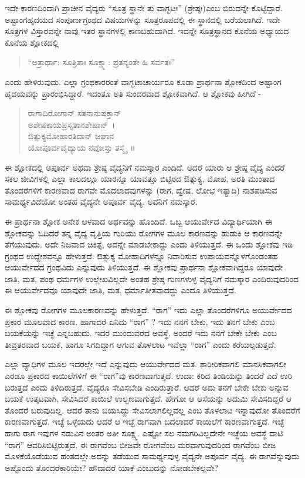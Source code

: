 {ಇದೇ ಕಾರಣದಿಂದಾಗಿ ಪ್ರಾಚೀನ ವೈದ್ಯರು “ಸೂತ್ರ ಸ್ಥಾನೇ ತು ವಾಗ್ಭಟಃ” \enginline{-} (ಶ್ರೇಷ್ಠಃ)ಎಂಬ ಬಿರುದನ್ನೇ ಕೊಟ್ಟಿದ್ದಾರೆ. ಅಷ್ಟಾಂಗಹೃದಯದ ಸಂಪೂರ್ಣಗ್ರಂಥದ ವಿಷಯಗಳನ್ನು ಸೂತ್ರರೂಪದಲ್ಲಿ ಈ ಸ್ಥಾನದಲ್ಲಿ ಬರೆಯಲಾಗಿದೆ. ಇದೇ ಸೂತ್ರಗಳ ವಿಸ್ತಾರವನ್ನೇ ನಾವು ಇತರ ಸ್ಥಾನಗಳಲ್ಲಿ ಕಾಣಬಹುದಾಗಿದೆ. ಇದನ್ನೇ ಸೂತ್ರಸ್ಥಾನದ ಕೊನೆಯ ಅಧ್ಯಾಯದ ಕೊನೆಯ ಶ್ಲೋಕದಲ್ಲಿ 
\begin{verse}
“ಅತ್ರಾರ್ಥಾ: ಸೂತ್ರಿತಾಃ ಸೂಕ್ಷ್ಮಾ: ಪ್ರತನ್ಯಂತೇ ಹಿ ಸರ್ವತಃ” 
\end{verse}
ಎಂದು ಹೇಳಿರುವುದು. ಎಲ್ಲಾ ಗ್ರಂಥಕಾರರಂತೆ ವಾಗ್ಭಟಾಚಾರ್ಯರೂ ಕೂಡಾ ಪ್ರಾರ್ಥನಾ ಶ್ಲೋಕದಿಂದ ಅಷ್ಟಾಂಗ ಹೃದಯವನ್ನು ಪ್ರಾರಂಭಿಸಿದ್ದಾರೆ. ಇದಂತೂ ಅತಿ ಸುಂದರವಾದ ಶ್ಲೋಕವಾಗಿದೆ. ಆ ಶ್ಲೋಕವು ಹೀಗಿದೆ -\
\begin{verse}
ರಾಗಾದಿರೋಗಾನ್ ಸತನಾನುಷಕ್ತಾನ್\\
ಅಶೇಷಕಾಯಪ್ರಸೃತಾನಶೇಷಾನ್~। \\
ಔತ್ಸುಕ್ಯಮೋಹಾರತಿದಾನ್‍ ಜಘಾನ\\
ಯೋಪೂರ್ವವೈದ್ಯಾಯ ನವೋಸ್ತು ತಸ್ಮೈ~॥
\end{verse}
ಈ ಶ್ಲೋಕದಲ್ಲಿ ಅಪೂರ್ವ ಅಥವಾ ಶ್ರೇಷ್ಠ ವೈದ್ಯನಿಗೆ ನಮಸ್ಕಾರ ಎಂದಿದೆ. ಆದರೆ ಯಾರು ಆ ಶ್ರೇಷ್ಠ ವೈದ್ಯ ಎಂದರೆ ಸಕಲ ಜೀವಿಗಳಲ್ಲಿ ಎಲ್ಲಾ ಕಾಲದಲ್ಲೂ ಯಾರನ್ನೂ ಯಾವತ್ತೂ ಬಿಟ್ಟಿರದ ಔತ್ಸುಕ್ಯ, ಮೋಹ, ಅರತಿ ಮುಂತಾದ ತೊಂದರೆಗಳಿಗೆ ಕಾರಣವಾದ ರಾಗವೇ ಮೊದಲಾದವುಗಳನ್ನು (ರಾಗ, ದ್ವೇಷ, ಲೋಭ ಇತ್ಯಾದಿ) ನಾಶಪಡಿಸುವ ಸಾಮರ್ಥ್ಯವಿದೆಯೋ ಅಂತಹ ವೈದ್ಯನೇ ಅಪೂರ್ವ ವೈದ್ಯ. ಅವನಿಗೆ ನಮಸ್ಕಾರ.

ಈ ಪ್ರಾರ್ಥನಾ ಶ್ಲೋಕ ಅನೇಕ ಆಳವಾದ ಅರ್ಥವನ್ನು ಹೊಂದಿದೆ. ಒಬ್ಬ ಆಯುರ್ವೇದ ವಿದ್ಯಾರ್ಥಿಯಾಗಿ  ಈ ಶ್ಲೋಕವನ್ನು ಓದಿದರೆ ತನ್ನ ವೈದ್ಯ ವೃತ್ತಿಯ ಗುರಿಯು ರೋಗಗಳ ಮೂಲ ಕಾರಣವನ್ನು ಹುಡುಕಿ ಆ ಕಾರಣವನ್ನೇ ತೆಗೆಯುವುದು. ಅದೇ ನಿಜವಾದ ಚಿಕಿತ್ಸೆ, ಅದನ್ನೇ ಮಾಡಬೇಕಾದ್ದು ಎಂದು ತಿಳಿಯುತ್ತದೆ. ಈ ಒಂದು ಶ್ಲೋಕವು ಇಡಿ ಗ್ರಂಥದ ಉದ್ದೇಶವನ್ನೂ ಹೇಳುತ್ತದೆ. ಔತ್ಸುಕ್ಯ ಮೋಹಾದಿಗಳನ್ನೂ ನಿವಾರಿಸುವ ಉಪಾಯವನ್ನೊಳಗೊಂಡಂತಹ ಆಯುರ್ವೇದದ ಗ್ರಂಥವಿದು ಎನ್ನುವುದು ತಿಳಿಯುತ್ತದೆ. ಈ ಶ್ಲೋಕವು ಪ್ರಾರ್ಥನಾ ಶ್ಲೋಕವಾಗಿದ್ದರೂ ಯಾವುದೇ ಜಾತಿ, ಮತ, ಪಂಥ ಧರ್ಮಗಳ ಉಲ್ಲೇಖವಿಲ್ಲದೇ ಅಂತಹ ಶ್ರೇಷ್ಠ ಗುಣಗಳುಳ್ಳ ವೈದ್ಯನಿಗೆ ನಮಸ್ಕಾರ ಎಂದಿರುವುದರಿಂದ ಈ ಆಯುರ್ವೇದವೂ ಯಾವುದೇ ಜಾತಿ, ಮತ, ಧರ್ಮಾತೀತವಾದದ್ದು ಎಂದೂ ತಿಳಿಯುತ್ತದೆ.

ಈ ಶ್ಲೋಕವು ರೋಗಗಳ ಮೂಲಕಾರಣವನ್ನು ಹೇಳುತ್ತದೆ. “ರಾಗ” ಇದು ಎಲ್ಲಾ ತೊಂದರೆಗಳಿಗೂ ಅಯುರ್ವೇದದ ಪ್ರಕಾರ ಮೂಲವಾದ ಕಾರಣ. ಹಾಗಾದರೆ ಏನಿದು “ರಾಗ” ? ಇದು ನನಗೆ ಬೇಕು, ಇದು ತನಗೆ ಬೇಕು ಎಂಬ ಬಯಕೆಯನ್ನು ಇಚ್ಛೆ ಎನ್ನಬಹುದು. ಇದರ ಮುಂದುವರೆದ ಅವಸ್ಥೆ. ಅಂದರೆ ಇದು ನನಗೆ ಬೇಕೇ ಬೇಕು ಎಂಬ ತೀವ್ರತರವಾದ ಬಯಕೆ, ಹಾಗೂ ಸಿಗದಿದ್ದಾಗ ಆಗುವ ತೊಳಲಾಟ ಇವೆಲ್ಲಾ “ರಾಗ” ಎಂದು ಕರೆಯಲ್ಪಡುತ್ತದೆ.

ಎಲ್ಲಾ ವ್ಯಾಧಿಗಳ ಮೂಲ ಇದರಲ್ಲೇ ಇದೆ ಎನ್ನುವುದು ಆಯುರ್ವೇದದ ಮತ. ಶಾರೀರಿಕವಾಗಲಿ ಮಾನಸಿಕವಾಗಲೀ ಎರಡೂ ಪ್ರಕಾರದ ಕಾಯಿಲೆಗಳಿಗೆ ಈ “ರಾಗ”ವು ಕಾರಣವಾಗುತ್ತದೆ. ಉದಾ: ಕರಿದ ತಿಂಡಿಯನ್ನು ತಿಂದರೆ ಎದೆ ಉರಿ ಬರುತ್ತದೆ ಎಂದು ತಿಳಿದಿರುತ್ತದೆ. ವೈದ್ಯರೂ ಸೇವಿಸಬೇಡಿ ಎಂದಿರುತ್ತಾರೆ. ಆದರೆ ಅದು ತನಗೆ ಬೇಕೇ ಬೇಕು ಅನ್ನುವ ಬಯಕೆ ಉತ್ಕಟವಾಗಿ, ಸೇವಿಸಿದರೆ ಕಾಯಿಲೆ ಉಲ್ಬಣವಾಗುತ್ತದೆ. ಹೇಗೋ ಆ ಆಸೆಯನ್ನು ಅದುಮಿ ಸೇವಿಸದಿದ್ದರೆ ಆ ತೊಂದರೆ ಬರುವುದಿಲ್ಲ. ಆದರೆ ತಾನು ಬಯಸಿದ್ದು ಸೇವಿಸಲಾಗಲಿಲ್ಲವಲ್ಲ ಎಂಬ ತೊಳಲಾಟ ಇನ್ನಾವುದೋ ತೊಂದರೆಗೆ  ಕಾರಣ\-ವಾಗುತ್ತದೆ. ಇಚ್ಛೆ ಒಳ್ಳೆಯದು ಆದರೆ ಆ ಇಚ್ಛೆ ರಾಗವಾಗಿ ಬದಲಾದರೆ ಕಾಯಿಲೆಗೆ ಕಾರಣ\-ವಾಗುತ್ತದೆ. ಇಚ್ಛೆ ಹಾಗು ರಾಗ ಇವುಗಳ ನಡುವಿನ ಅಂತರ ಅತೀ ಸೂಕ್ಷ್ಮ. ಎಷ್ಟೋ ಸಲ ನಮಗರಿವಿಲ್ಲದೇನೇ ಇಚ್ಛೆಯ ಅವಸ್ಥೆ ದಾಟಿ “ರಾಗ” ಆವರಿಸಿಬಿಟ್ಟಿರುತ್ತದೆ. ಈ ರಾಗವೆಂಬ ಬೀಜವೇ ರೋಗವೆಂಬ ಮರವಾಗುವುದರಿಂದ ರಾಗವೆಂಬ ಬೀಜ ಮೊಳಕೆಯೊಡೆಯುವ ಹಂತದಲ್ಲೇ ಅದನ್ನು ತಡೆಯುವ ಸಾಮರ್ಥ್ಯವುಳ್ಳ ವೈದ್ಯನೇ ಅಪೂರ್ವ ವೈದ್ಯ. ಈ ರಾಗವೆನ್ನುವುದು ಅಷ್ಟೊಂದು ತೊಂದರೆಕಾರಿಯೇ? ಹೌದಾದರೆ ಯಾಕೆ ಎಂಬುದನ್ನು ನೋಡಬೇಕಲ್ಲವೇ?

}

